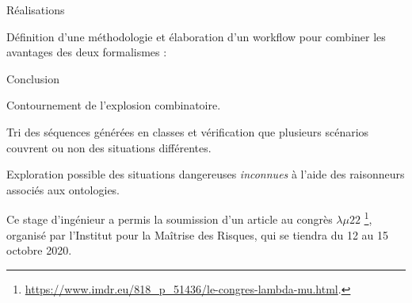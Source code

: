 \documentclass[
  hyperref={
    pdfusetitle,
    pdfencoding=auto,
    psdextra,
    colorlinks=true,
    linkcolor=darkblue,
    citecolor=darkred,
    urlcolor=darkblue,
  },
  9pt,
  aspectratio=169,
]{beamer}
\begin{document}
\begin{frame}[allowframebreaks]{Réalisations}


  Définition d'une méthodologie et élaboration d'un workflow
  pour combiner les avantages des deux formalismes :

  \vspace{1cm}

  \begin{figure}[htb]
    \centering
    \begin{large}
      \begin{tikzpicture}
        
      \end{tikzpicture}
    \end{large}
  \end{figure}

  \alert{Conclusion}

  Contournement de l'explosion combinatoire.

  Tri des séquences générées en classes
  et vérification que plusieurs scénarios couvrent ou non
  des situations différentes.

  Exploration possible des situations dangereuses \emph{inconnues}
  à l'aide des raisonneurs associés aux ontologies.

  Ce stage d'ingénieur a permis la soumission d'un article
  au congrès \( \lambda \mu 22 \)%
  \footnote{\url{https://www.imdr.eu/818_p_51436/le-congres-lambda-mu.html}.},
  organisé par l'Institut pour la Maîtrise des Risques,
  qui se tiendra du \num{12} au \num{15} octobre \num{2020}.

\end{frame}
\end{document}
